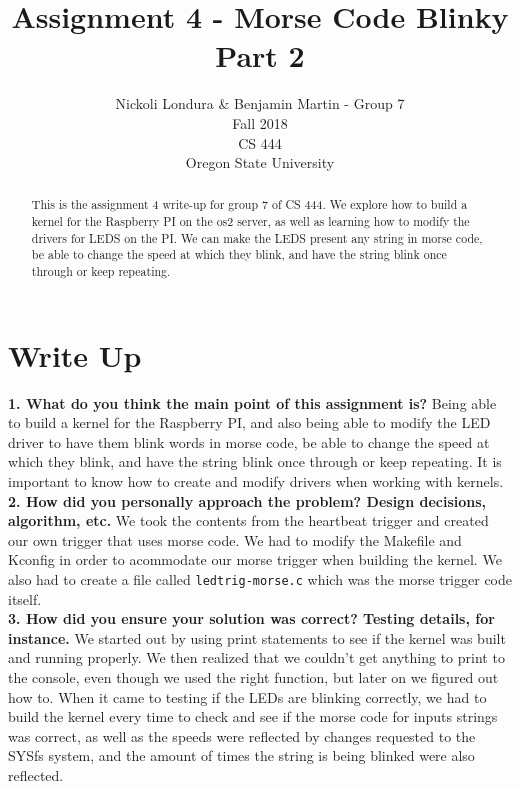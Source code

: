 \documentclass[10pt,english]{article}
\title{Assignment 4 - Morse Code Blinky Part 2}
\author{Nickoli Londura \& Benjamin Martin - Group 7 \\ Fall 2018 \\ CS 444 \\ Oregon State University}
\begin{document}
\maketitle

\begin{abstract}

\noindent This is the assignment 4 write-up for group 7 of CS 444. We explore how to build a kernel for the Raspberry PI on the os2 server, as well as learning how to modify the drivers for LEDS on the PI. We can make the LEDS present any string in morse code, be able to change the speed at which they blink, and have the string blink once through or keep repeating.

\end{abstract}

\newpage

\section{Write Up}

\textbf{1. What do you think the main point of this assignment is?}
Being able to build a kernel for the Raspberry PI, and also being able to modify the LED driver to have them blink words in morse code, be able to change the speed at which they blink, and have the string blink once through or keep repeating. It is important to know how to create and modify drivers when working with kernels. \\

\noindent \textbf{2. How did you personally approach the problem? Design decisions, algorithm, etc.}
We took the contents from the heartbeat trigger and created our own trigger that uses morse code. We had to modify the Makefile and Kconfig in order to acommodate our morse trigger when building the kernel. We also had to create a file called \verb|ledtrig-morse.c| which was the morse trigger code itself. \\


\noindent \textbf{3. How did you ensure your solution was correct? Testing details, for instance.}
We started out by using print statements to see if the kernel was built and running properly. We then realized that we couldn't get anything to print to the console, even though we used the right function, but later on we figured out how to. When it came to testing if the LEDs are blinking correctly, we had to build the kernel every time to check and see if the morse code for inputs strings was correct, as well as the speeds were reflected by changes requested to the SYSfs system, and the amount of times the string is being blinked were also reflected.\\
\end{document}
